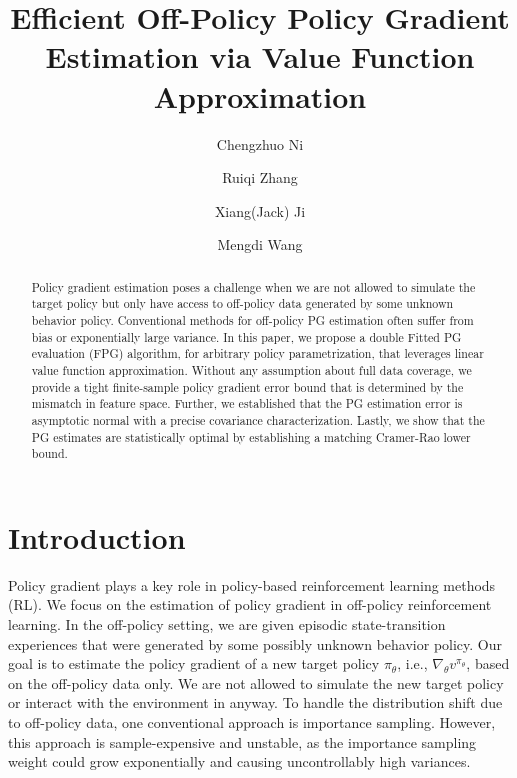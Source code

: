 \documentclass{article}
\numberwithin{equation}{section}
\begin{document}
\title{Efficient Off-Policy Policy Gradient Estimation via Value Function Approximation}
\author[1]{Chengzhuo Ni}
\author[2]{Ruiqi Zhang}
\author[1]{Xiang(Jack) Ji}
\author[1]{Mengdi Wang}
\date{}
\maketitle

\begin{abstract}
    Policy gradient estimation poses a challenge when we are not allowed to simulate the target policy but only have access to off-policy data generated by some unknown behavior policy. Conventional methods for off-policy PG estimation often suffer from bias or exponentially large variance. In this paper, we propose a double Fitted PG evaluation (FPG) algorithm, for arbitrary policy parametrization, that leverages linear value function approximation. Without any assumption about full data coverage, we provide a tight finite-sample policy gradient error bound that is determined by the mismatch in feature space. Further, we established that the PG estimation error is asymptotic normal with a precise covariance characterization. Lastly, we show that the PG estimates are statistically optimal by establishing a matching Cramer-Rao lower bound.
\end{abstract}

\section{Introduction}
Policy gradient plays a key role in policy-based reinforcement learning methods (RL). We focus on the estimation of policy gradient in off-policy reinforcement learning. In the off-policy setting, we are given episodic state-transition experiences that were generated by some possibly unknown behavior policy. Our goal is to estimate the policy gradient of a new target policy $\pi_\theta$, i.e., $\nabla_\theta v^{\pi_{\theta}}$, based on the off-policy data only. We are not allowed to simulate the new target policy or interact with the environment in anyway. To handle the distribution shift due to off-policy data, one conventional approach is importance sampling. However, this approach is sample-expensive and unstable, as the importance sampling weight could grow exponentially and causing uncontrollably high variances.
\end{document}
